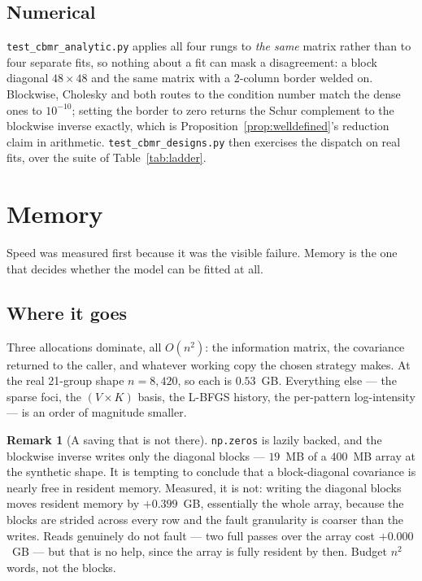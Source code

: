 \documentclass[11pt,a4paper]{article}
\theoremstyle{plain}
\theoremstyle{definition}
\newtheorem{remark}[proposition]{Remark}
\begin{document}
\subsection{Numerical}

\texttt{test\_cbmr\_analytic.py} applies all four rungs to \emph{the same} matrix rather than to
four separate fits, so nothing about a fit can mask a disagreement: a block diagonal
$48\times48$ and the same matrix with a $2$-column border welded on. Blockwise, Cholesky and
both routes to the condition number match the dense ones to $10^{-10}$; setting the border to
zero returns the Schur complement to the blockwise inverse exactly, which is
Proposition~\ref{prop:welldefined}'s reduction claim in arithmetic.
\texttt{test\_cbmr\_designs.py} then exercises the dispatch on real fits, over the suite of
Table~\ref{tab:ladder}.

\section{Memory}

Speed was measured first because it was the visible failure. Memory is the one that decides
whether the model can be fitted at all.

\subsection{Where it goes}

Three allocations dominate, all $O(n^2)$: the information matrix, the covariance returned to the
caller, and whatever working copy the chosen strategy makes. At the real 21-group shape
$n = 8{,}420$, so each is $0.53$~GB. Everything else --- the sparse foci, the
$(V\times K)$ basis, the L-BFGS history, the per-pattern log-intensity --- is an order of
magnitude smaller.

\begin{remark}[A saving that is not there]
\texttt{np.zeros} is lazily backed, and the blockwise inverse writes only the diagonal blocks
--- $19$~MB of a $400$~MB array at the synthetic shape. It is tempting to conclude that a
block-diagonal covariance is nearly free in resident memory. Measured, it is not: writing the
diagonal blocks moves resident memory by $+0.399$~GB, essentially the whole array, because the
blocks are strided across every row and the fault granularity is coarser than the writes.
Reads genuinely do not fault --- two full passes over the array cost $+0.000$~GB --- but that is
no help, since the array is fully resident by then. Budget $n^2$ words, not the blocks.
\end{remark}
\end{document}
